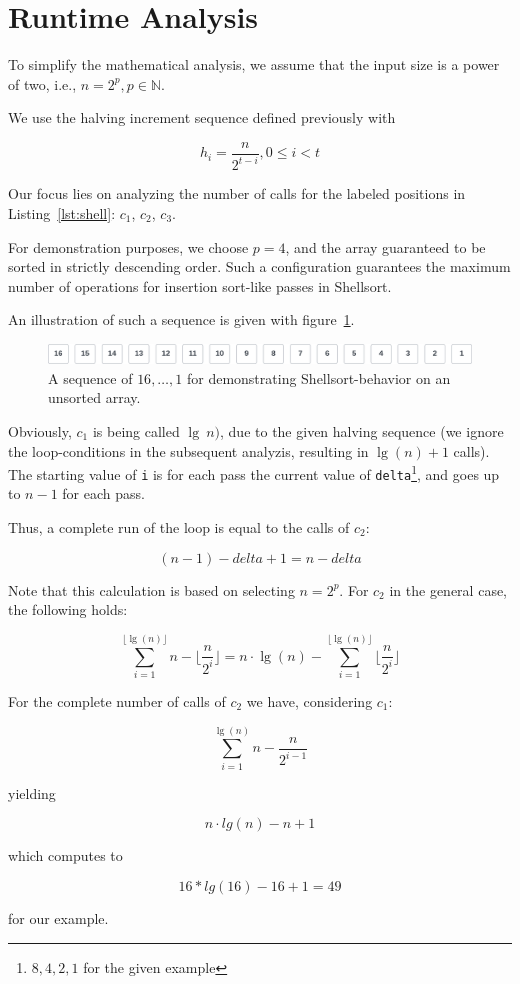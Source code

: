 \section{Runtime Analysis}

To simplify the mathematical analysis, we assume that the input size is a power of two, i.e., $n = 2^p, p \in \mathbb{N}$.



We use the halving increment sequence defined previously with

\[
    h_i = \frac{n}{2^{t-i}}, 0 \leq i < t
\]

Our focus lies on analyzing the number of calls for the labeled positions in Listing~\ref{lst:shell}: $c_1$, $c_2$, $c_3$.

For demonstration purposes, we choose $p=4$, and the array guaranteed to be sorted in strictly descending order.
Such a configuration guarantees the maximum number of operations for insertion sort-like passes in Shellsort.

An illustration of such a sequence is given with figure~\ref{fig:bestcase}.


\begin{figure}[!h]
    \centering
    \includegraphics[width=1\columnwidth]{img/bestcase-sequence}
    \caption{A sequence of $16, \ldots, 1$ for demonstrating Shellsort-behavior on an unsorted array.}
    \label{fig:bestcase}
\end{figure}


Obviously, $c_1$ is being called $\lg\ n)$, due to the given halving sequence (we ignore the loop-conditions in the subsequent analyzis, resulting in $\lg(n) + 1$ calls).
The starting value of \texttt{i} is for each pass the current value of \texttt{delta}\footnote{
    $8, 4, 2, 1$ for the given example
}, and goes up to $n-1$ for each pass.

Thus, a complete run of the loop is equal to the calls of $c_2$:

\[
    (n - 1) - delta + 1 = n - delta
\]

Note that this calculation is based on selecting $n = 2^p$.
For $c_2$ in the general case, the following holds:

\[
    \sum_{i=1}^{\lfloor \lg(n) \rfloor} n - \lfloor \frac{n}{2^i} \rfloor = n \cdot \lg(n) - \sum_{i=1}^{\lfloor \lg(n) \rfloor} \lfloor \frac{n}{2^i} \rfloor
\]

For the complete number of calls of $c_2$ we have, considering $c_1$:

\[
    \sum_{i=1}^{\lg(n)} n - \frac{n}{2^{i-1}}
\]


yielding

\[
    n \cdot lg(n) - n + 1
\]

which computes to

\[
    16 * lg(16) - 16 + 1 = 49
\]

for our example.

